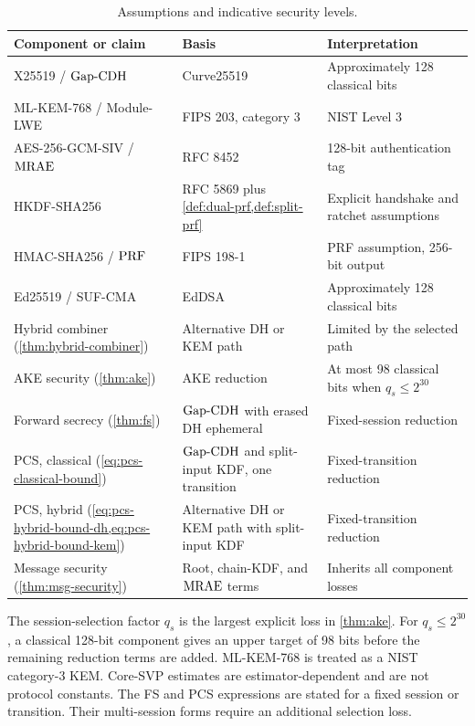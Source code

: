 \documentclass[preprint,12pt]{elsarticle}
\theoremstyle{definition}
\newcommand{\tech}[1]{\textnormal{#1}}
\newcommand{\GapCDH}{\tech{Gap-CDH}}
\newcommand{\MRAE}{\tech{MRAE}}
\newcommand{\PRF}{\tech{PRF}}
\begin{document}
\begin{table}[t]
\centering
\caption{Assumptions and indicative security levels.}\label{tab:bounds}
\small
\begin{tabularx}{\textwidth}{@{}L{0.29\textwidth}L{0.39\textwidth}Y@{}}
\toprule
Component or claim & Basis & Interpretation \\
\midrule
X25519 / $\GapCDH$ & Curve25519~\cite{rfc7748} & Approximately 128 classical bits \\
ML-KEM-768 / Module-LWE & FIPS 203, category 3~\cite{fips203} & NIST Level 3 \\
AES-256-GCM-SIV / $\MRAE$ & RFC 8452~\cite{rfc8452} & 128-bit authentication tag \\
HKDF-SHA256 & RFC 5869 plus \cref{def:dual-prf,def:split-prf} & Explicit handshake and ratchet assumptions \\
HMAC-SHA256 / $\PRF$ & FIPS 198-1~\cite{fips198} & PRF assumption, 256-bit output \\
Ed25519 / SUF-CMA & EdDSA~\cite{rfc8032} & Approximately 128 classical bits \\
\midrule
Hybrid combiner (\cref{thm:hybrid-combiner}) & Alternative DH or KEM path & Limited by the selected path \\
AKE security (\cref{thm:ake}) & AKE reduction & At most 98 classical bits when $q_s\leq2^{30}$ \\
Forward secrecy (\cref{thm:fs}) & $\GapCDH$ with erased DH ephemeral & Fixed-session reduction \\
PCS, classical (\cref{eq:pcs-classical-bound}) & $\GapCDH$ and split-input KDF, one transition & Fixed-transition reduction \\
PCS, hybrid (\cref{eq:pcs-hybrid-bound-dh,eq:pcs-hybrid-bound-kem}) & Alternative DH or KEM path with split-input KDF & Fixed-transition reduction \\
Message security (\cref{thm:msg-security}) & Root, chain-KDF, and $\MRAE$ terms & Inherits all component losses \\
\bottomrule
\end{tabularx}
\end{table}

The session-selection factor $q_s$ is the largest explicit loss in
\cref{thm:ake}. For $q_s \leq 2^{30}$, a classical 128-bit component gives an
upper target of 98 bits before the remaining reduction terms are added.
ML-KEM-768 is treated as a NIST category-3 KEM. Core-SVP estimates are
estimator-dependent and are not protocol constants. The FS and PCS expressions
are stated for a fixed session or transition. Their multi-session forms require
an additional selection loss.
\end{document}
